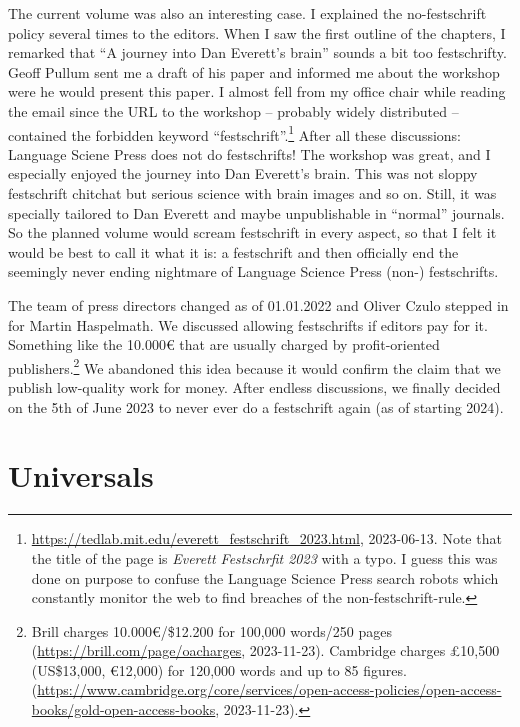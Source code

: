 \documentclass[output=paper,colorlinks,citecolor=brown]{langscibook}
\begin{document}
The current volume was also an interesting case. I explained the no-festschrift policy several
times to the editors. When I saw the first outline of the chapters, I remarked that ``A journey into Dan Everett's
brain'' sounds a bit too festschrifty. Geoff Pullum sent me a draft of his paper and informed me
about the workshop were he would present this paper. I almost fell from my office chair while
reading the email since the URL to the workshop -- probably widely distributed -- contained the forbidden keyword
``festschrift''.\footnote{
\url{https://tedlab.mit.edu/everett_festschrift_2023.html}, 2023-06-13. Note that the title of the
page is \emph{Everett Festschrfit 2023} with a typo. I guess this was done on purpose to confuse the
Language Science Press search robots which constantly monitor the web to find breaches of the
non-festschrift-rule.
} After all these discussions: Language Sciene Press does not do festschrifts! The
workshop was great, and I especially enjoyed the journey into Dan Everett's brain. This was not
sloppy festschrift chitchat but serious science with brain images and so on. Still, it was specially
tailored to Dan Everett and maybe unpublishable in ``normal'' journals. So the planned volume would
scream festschrift in every aspect, so that I felt it would be best to call it what it is: a festschrift
and then officially end the seemingly never ending nightmare of Language Science Press (non-) festschrifts. 

The team of press directors changed as of 01.01.2022 and Oliver Czulo stepped in for
Martin Haspelmath. We discussed allowing festschrifts if editors pay for it. Something like the
10.000€ that are usually charged by profit-oriented publishers.\footnote{
Brill charges 10.000€/\$12.200 for 100,000 words/250 pages (\url{https://brill.com/page/oacharges},
2023-11-23). Cambridge charges £10,500 (US\$13,000, €12,000) for 120,000 words and up to 85 figures.
(\url{https://www.cambridge.org/core/services/open-access-policies/open-access-books/gold-open-access-books}, 2023-11-23).
} 
 We abandoned this idea because it
would confirm the claim that we publish low-quality work for money. After endless discussions, we
finally decided on the 5th of June 2023 to never ever do a festschrift again (as of starting 2024). 






\section{Universals}
\end{document}
